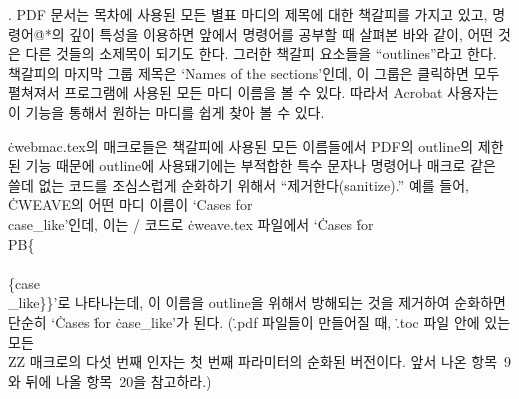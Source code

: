 {%
. {\mc PDF} 문서는 목차에 사용된 모든 별표 마디의 제목에 대한
책갈피를 가지고 있고, 명령어\.{@*}의 깊이 특성을 이용하면
앞에서 명령어를 공부할 때 살펴본 바와 같이, 어떤 것은 다른 것들의
소제목이 되기도 한다. 그러한 책갈피 요소들을 
``outlines''라고 한다. 책갈피의 마지막 그룹 제목은 `Names of the
sections'인데, 이 그룹은 클릭하면 모두 펼쳐져서 프로그램에 사용된 모든
마디 이름을 볼 수 있다. 따라서 Acrobat 사용자는 이 기능을 통해서
원하는 마디를 쉽게 찾아 볼 수 있다. 

\.{cwebmac.tex}의 매크로들은 책갈피에
사용된 모든 이름들에서 {\mc PDF}의 outline의 제한된 기능 때문에
outline에 사용돼기에는 부적합한 특수 문자나 명령어나 매크로 같은 쓸데%
없는 코드를 조심스럽게 순화하기 위해서 ``제거한다(sanitize).'' 예를 들어, \.{CWEAVE}의
어떤 마디 이름이 `Cases for \\{case\_like}'인데, 이는 \TEX/ 코드로
\.{cweave.tex} 파일에서 `\.{Cases} \.{for}
\.{\\PB\{\\\\\{case\\\_like\}\}}'로 나타나는데, 이 이름을 outline을
위해서 방해되는 것을 제거하여 순화하면 단순히
`\.{Cases} \.{for} \.{case\_like}'가 된다. 
(\.{.pdf} 파일들이 만들어질 때, \.{.toc} 파일 안에 있는 모든 \.{\\ZZ}
매크로의 다섯 번째 인자는 첫 번째 파라미터의 순화된 버전이다. 앞서 나온
항목~9와 뒤에 나올 항목~20을 참고하라.)

}
